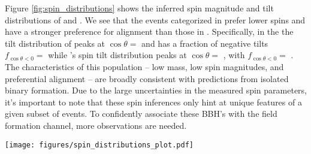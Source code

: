 Figure \ref{fig:spin_distributions} shows the inferred spin magnitude and tilt distributions of \popA{} and \popB{}. We see that the events categorized in \popA{} prefer lower spins and have a stronger preference for alignment than those in \popB{}. Specifically, in the \base{} the tilt distribution of \popA{} peaks at $\cos{\theta}=$ \result{$\CIPlusMinus{\macros[CosTilt][Base][PeakA][max]}$} and has a fraction of negative tilts $f_{\cos{\theta} < 0} = $ \result{$\CIPlusMinus{\macros[CosTilt][Base][PeakA][negfrac]}$} while \popB{}'s spin tilt distribution peaks at $\cos{\theta}=$ \result{$\CIPlusMinus{\macros[CosTilt][Base][ContinuumB][max]}$}, with $f_{\cos{\theta} < 0} = $ \result{$\CIPlusMinus{\macros[CosTilt][Base][ContinuumB][negfrac]}$}. The characteristics of this population -- low mass, low spin magnitudes, and preferential alignment -- are broadly consistent with predictions from isolated binary formation. Due to the large uncertainties in the measured spin parameters, it's important to note that these spin inferences only hint at unique features of a given subset of events. To confidently associate these BBH's with the field formation channel, more observations are needed.

\begin{figure*}[ht!]
    \begin{centering}
        \texttt{[image: figures/spin\_distributions\_plot.pdf]}
        \caption{The spin magnitude and tilt distributions inferred by the \base{} (top left and bottom left) and the \comp{} (top right and bottom right). In each panel, the medians of the subpopulation component distributions are shown in dashed lines and the shaded regions indicate the $90\%$ credible regions. The dashed gray lines show the $90\%$ credible bounds of the B-Spline models' prior predictive distributions. The subpopulation distributions are not weighted by their respective branching ratios.}
        \label{fig:spin_distributions}
    \end{centering}
\end{figure*}

